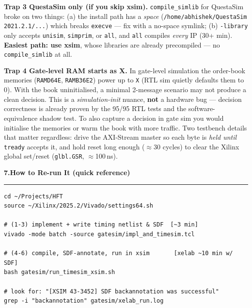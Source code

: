 \documentclass[10pt,a4paper]{article}
\newcommand{\sectionrule}{\par\nobreak\vspace{1pt}\textcolor{rulegray}{\rule{\linewidth}{0.8pt}}\par\vspace{1pt}}
\newcommand{\fpath}[1]{\texttt{\textcolor{hdrblue}{#1}}}
\begin{document}
\begin{warnboxx}
\textbf{Trap 3 \textendash{} QuestaSim only (if you skip xsim).}
\texttt{compile\_simlib} for QuestaSim broke on two things: (a) the install path
has a \emph{space} (\fpath{/home/abhishek/QuestaSim 2021.2.1/...}) which breaks
\texttt{execve} --- fix with a no-space symlink; (b) \texttt{-library} only accepts
\texttt{unisim}, \texttt{simprim}, or \texttt{all}, and \texttt{all} compiles
\emph{every} IP (30+ min). \textbf{Easiest path: use xsim}, whose libraries are
already precompiled --- no \texttt{compile\_simlib} at all.
\end{warnboxx}

\begin{warnboxx}
\textbf{Trap 4 \textendash{} Gate-level RAM starts as X.}
In gate-level simulation the order-book memories (\texttt{RAMD64E},
\texttt{RAMB36E2}) power up to \texttt{X} (RTL sim quietly defaults them to 0). With
the book uninitialised, a minimal 2-message scenario may not produce a clean
decision. This is a \emph{simulation-init} nuance, \textbf{not} a hardware bug ---
decision correctness is already proven by the 95/95 RTL tests and the
software-equivalence shadow test. To also capture a decision in gate sim you would
initialise the memories or warm the book with more traffic. Two testbench details
that matter regardless: drive the AXI-Stream master so each byte is \emph{held
until} \texttt{tready} accepts it, and hold reset long enough ($\approx$30 cycles)
to clear the Xilinx global set/reset (\texttt{glbl.GSR}, $\approx$100\,ns).
\end{warnboxx}

{\large\bfseries\color{hdrblue} 7.\quad How to Re-run It (quick reference)}
\sectionrule

\begin{lstlisting}[style=sh]
cd ~/Projects/HFT
source ~/Xilinx/2025.2/Vivado/settings64.sh

# (1-3) implement + write timing netlist & SDF  [~3 min]
vivado -mode batch -source gatesim/impl_and_timesim.tcl

# (4-6) compile, SDF-annotate, run in xsim       [xelab ~10 min w/ SDF]
bash gatesim/run_timesim_xsim.sh

# look for: "[XSIM 43-3452] SDF backannotation was successful"
grep -i "backannotation" gatesim/xelab_run.log
\end{lstlisting}
\end{document}
